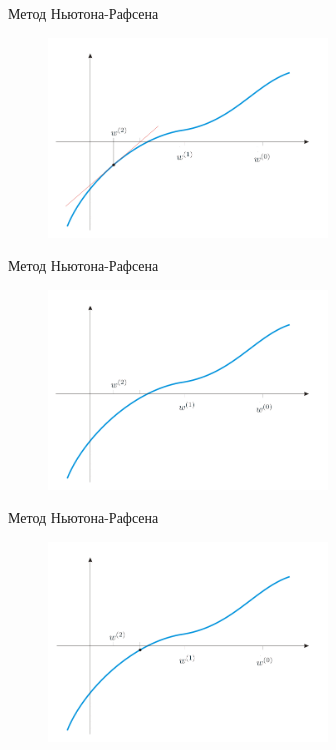 \documentclass[10pt]{beamer}
\begin{document}
\begin{frame}{Метод Ньютона-Рафсена}
	\begin{figure}[htbp]
	  \includegraphics[height=150pt, keepaspectratio = true]{images/newton-12}   
	\end{figure}
\end{frame}

\begin{frame}{Метод Ньютона-Рафсена}
	\begin{figure}[htbp]
	  \includegraphics[height=150pt, keepaspectratio = true]{images/newton-13}   
	\end{figure}
\end{frame}

\begin{frame}{Метод Ньютона-Рафсена}
	\begin{figure}[htbp]
	  \includegraphics[height=150pt, keepaspectratio = true]{images/newton-14}   
	\end{figure}
\end{frame}
\end{document}
